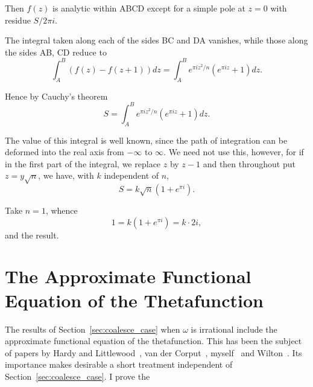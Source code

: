 \documentclass[12pt]{article}
\theoremstyle{remark}
\begin{document}
Then $f(z)$ is analytic within ABCD except for a simple pole at $z=0$ with residue $S/2\pi i$.

The integral taken along each of the sides BC and DA vanishes, while those along the sides AB, CD reduce to
\begin{equation}\label{eq:contour_integral_sides}
\int_A^B (f(z) - f(z + 1)) dz = \int_A^B e^{\pi iz^2/n}(e^{\pi iz} + 1)dz.
\end{equation}

Hence by Cauchy's theorem
\begin{equation}\label{eq:gauss_sum_final}
S = \int_A^B e^{\pi iz^2/n}(e^{\pi iz} + 1)dz.
\end{equation}

The value of this integral is well known, since the path of integration can be deformed into the real axis from $-\infty$ to $\infty$. We need not use this, however, for if in the first part of the integral, we replace $z$ by $z - 1$ and then throughout put $z = y\sqrt{n}$, we have, with $k$ independent of $n$,
\begin{equation}\label{eq:gauss_sum_scaling}
S = k\sqrt{n}(1 + e^{\pi i}).
\end{equation}

Take $n = 1$, whence
\begin{equation}\label{eq:gauss_sum_normalization}
1 = k(1 + e^{\pi i}) = k \cdot 2i,
\end{equation}
and the result.

\section{The Approximate Functional Equation of the Thetafunction}\label{sec:approximate_functional_equation}

The results of Section~\ref{sec:coalesce_case} when $\omega$ is irrational include the approximate functional equation of the thetafunction. This has been the subject of papers by Hardy and Littlewood~\cite{HardyLittlewood1921,HardyLittlewood1923,HardyLittlewood1925}, van der Corput~\cite{vanderCorput1922,vanderCorput1923}, myself~\cite{Mordell1926} and Wilton~\cite{Wilton1927}. Its importance makes desirable a short treatment independent of Section~\ref{sec:coalesce_case}. I prove the
\end{document}
